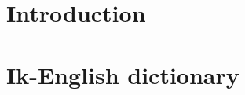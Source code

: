 \documentclass[output=book,
  nonflat,
  modfonts 
		  ]{langsci/langscibook}
\begin{document}
     
 
 

\maketitle                
\frontmatter

\tableofcontents
% 
% 



%  

\mainmatter   
\part{Introduction}

% 
% 
% 
% 
% 
% 
% 
% 

  

\newcommand{\headrulewidth}{0pt}
\setlength{\columnsep}{3em}
\setlength{\parindent}{0pt}

\part{Ik-English dictionary}
\renewcommand{\lsgloss}[1]{} 
\renewcommand{\citationform}[1]{\textbf{#1}\markboth{#1}{#1}} 

 

\renewcommand{\lsgloss}[1]{\textbf{#1}\markboth{#1}{#1}}
\renewcommand{\definition}[1]{\textbf{#1}\markboth{#1}{#1}}
\renewcommand{\citationform}[1]{{#1}}
\renewcommand{\homograph}[1]{\textsuperscript{#1}}
\end{document}
